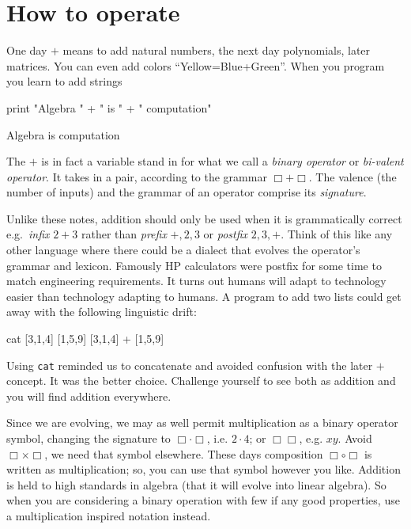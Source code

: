 \chapter{How to operate}

One day  $+$ means to add natural numbers, the next day 
polynomials, later matrices.  
You can even add colors ``Yellow=Blue+Green''. When you program 
you learn to add strings
\begin{center}
\begin{notebookin}
print "Algebra " + " is " + " computation"
\end{notebookin}
\begin{notebookout}
Algebra is computation
\end{notebookout}
\end{center}
The $+$ is in fact a variable stand in for what we call a \emph{binary operator}
or \emph{bi-valent operator}.  It takes in a pair, 
according to the grammar $\Box+\Box$.  The valence (the number of inputs) and the grammar 
of an operator comprise its  \emph{signature}.  

Unlike these notes, addition should only be used when it is grammatically 
correct e.g.\ \emph{infix} $2+3$ rather than \emph{prefix} $+,2,3$ or
\emph{postfix} $2,3,+$.  Think of this like any other language 
where there could be a dialect that evolves the operator's grammar and lexicon.
Famously HP calculators were postfix for some time to match engineering requirements.
It turns out humans will adapt to technology easier than technology adapting to humans.
A program to add two lists could get away with the following linguistic drift:
\begin{center}
\begin{notebookin}
cat [3,1,4] [1,5,9]
[3,1,4] + [1,5,9]
\end{notebookin}
\begin{notebookout}[2]
[3,1,4,1,5,9]
[4,6,13]
\end{notebookout}
\end{center}
Using \texttt{cat} reminded us to concatenate and avoided confusion with the later $+$ 
concept.  It was the better choice.
Challenge yourself to see both as addition and you will 
find addition everywhere. 

Since we are evolving, we may as well permit multiplication as a binary operator
symbol, changing the signature to $\Box \cdot \Box$, i.e. $2\cdot 4$; or
$\Box\Box$, e.g. $xy$.   Avoid $\Box\times \Box$, we need that symbol elsewhere.
These days composition $\Box\circ\Box$ is written as multiplication; so, you can
use that symbol however you like.  Addition is held to high standards in algebra
(that it will evolve into linear algebra).  So when you are considering a binary
operation with few if any good properties, use a multiplication inspired
notation instead.   


